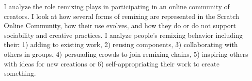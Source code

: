 I analyze the role remixing plays in participating in an online community of creators.
I look at how several forms of remixing are represented in the Scratch Online Community, how their use evolves, and how they do or do not support sociability and creative practices.
I analyze people's remixing behavior including their: 
1) adding to existing work, 
2) reusing components, 
3) collaborating with others in groups, 
4) persuading crowds to join remixing chains, 
5) inspiring others with ideas for new creations or 
6) self-appropriating their work to create something. 
